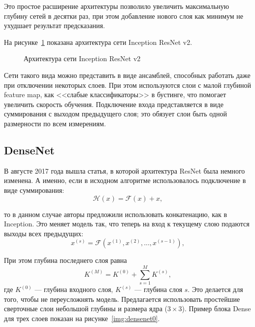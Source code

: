 \documentclass[12pt, specialist, subf, substylefile = spbu.rtx]{disser}
\begin{document}
Это простое расширение архитектуры позволило увеличить максимальную глубину сетей в десятки раз, при этом добавление нового слоя как минимум не ухудшает результат предсказания.

На рисунке~\ref{img:IncResNet_v2} показана архитектура сети Inception ResNet v2.

\begin{figure}[h]
\caption{Архитектура сети Inception ResNet v2}
\label{img:IncResNet_v2}
\end{figure}

Сети такого вида можно представить в виде ансамблей, способных работать даже при отключении некоторых слоев. При этом используются слои с малой глубиной feature map, как <<слабые классификаторы>> в бустинге, что помогает увеличить скорость обучения. Подключение входа представляется в виде суммирования с выходом предыдущего слоя; это обязует слои быть одной размерности по всем измерениям.

\subsection{DenseNet}

В августе 2017 года вышла статья, в которой архитектура ResNet была немного изменена. А именно, если в исходном алгоритме использовалось подключение в виде суммирования:
$$
\mathcal{H}(x)=\mathcal{F}(x)+x,
$$

то в данном случае авторы предложили использовать конкатенацию, как в Inception. Это меняет модель так, что теперь на вход к текущему слою подаются выходы всех предыдущих:
$$
x^{(s)}=\mathcal{F}(x^{(1)}, x^{(2)}, ..., x^{(s-1)}),
$$

При этом глубина последнего слоя равна
$$
K^{(M)}=K^{(0)} + \sum_{s=1}^M K^{(s)},
$$
где $K^{(0)}$ --- глубина входного слоя, $K^{(s)}$ --- глубина слоя $s$. Это делается для того, чтобы не переусложнять модель. Предлагается использовать простейшие сверточные слои небольшой глубины и размера ядра ($3 \times 3$). Пример блока Dense для трех слоев показан на рисунке~\ref{img:densenet0}.
\end{document}
